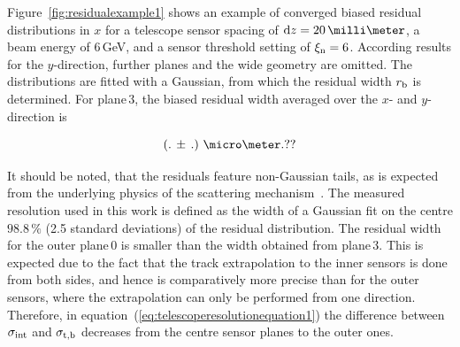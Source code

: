 Figure~\ref{fig:residualexample1} shows an example of converged biased residual distributions in $x$ for a telescope sensor spacing of $\dz = 20\,\milli\meter$,
 a beam energy of 6\,GeV, and a sensor threshold setting of $\xi_{\textrm{n}} = 6$. 
According results for the $y$-direction, further planes and the wide geometry are omitted. 
The distributions are fitted with a Gaussian, from which the residual width $r_{\textrm{b}}$ is determined. 
For plane\,3, the biased residual width averaged over the $x$- and $y$-direction is 

\begin{equation}
\left( .\,\pm\, \allowbreak . \right)\,\micro\meter. ?? 
\end{equation}

\noindent
It should be noted, that the residuals feature non-Gaussian tails, as is expected from the underlying physics of the scattering mechanism~\cite{ref:PDG-2014}. 
The measured resolution used in this work is defined as the width of a Gaussian fit on the centre $98.8\,\%$ (2.5 standard deviations) of the residual distribution.
The residual width for the outer plane\,0 is smaller than the width obtained from plane\,3.
This is expected due to the fact that the track extrapolation to the inner sensors is done from both sides, and hence is comparatively more precise than for the outer sensors,
 where the extrapolation can only be performed from one direction. 
Therefore, in equation~(\ref{eq:telescoperesolutionequation1}) the difference between $\sigma_{\textrm{int}}$ and $\sigma_{\textrm{t,b}}$ decreases from the centre sensor planes to the outer ones. 

% 

